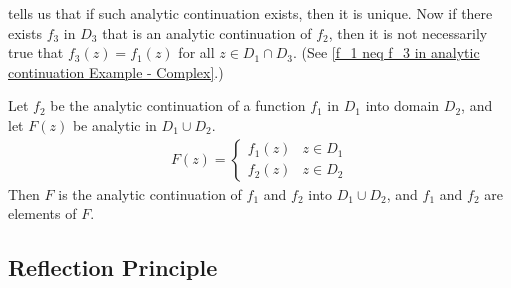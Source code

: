 \documentclass[12pt, english]{book}
\begin{document}
	\begin{figure}[H]
		\centering
	\end{figure}

	 tells us that if such analytic continuation exists, then it is unique. Now if there exists \(f_3\) in \(D_3\) that is an analytic continuation of \(f_2\), then it is not necessarily true that \(f_3(z) = f_1(z)\) for all \(z \in D_1 \cap D_3\). (See \cref{f_1 neq f_3 in analytic continuation Example - Complex}.)
	
	\begin{definition}
		\label{Elements of a function Definition - Complex}
		Let \(f_2\) be the analytic continuation of a function \(f_1\) in \(D_1\) into domain \(D_2\), and let \(F(z)\) be analytic in \(D_1 \cup D_2\).
		\begin{align*}
			F(z) = 
			\begin{cases}
				f_1(z) & z \in D_1 \\
				f_2(z) & z \in D_2
			\end{cases}
		\end{align*}
		Then \(F\) is the analytic continuation of \(f_1\) and \(f_2\) into \(D_1 \cup D_2\), and \(f_1\) and \(f_2\) are elements of \(F\).
	\end{definition}
	
	\subsection{Reflection Principle} \label{Reflection Principle Subsection - Complex}
	
\end{document}
